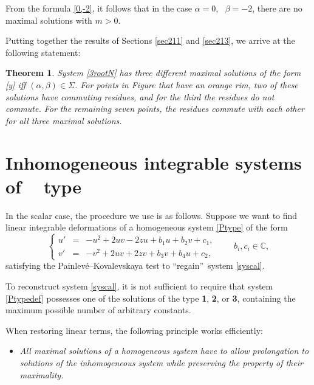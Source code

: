 \documentclass{article}
\theoremstyle{plain}
\newtheorem{theorem}{Theorem}
\DeclareMathOperator{\PIV}{P_{4}}
\newcommand{\PPainleve}{Painlev{\'e}}
\begin{document}
From the formula \eqref{0,-2}, it follows that in the case  $\alpha=0$, \, $\beta=-2$, there are no maximal solutions with $m>0$.

Putting together the results of Sections \ref{sec211} and \ref{sec213}, we arrive at the following statement:

\begin{theorem}\label{theo4}
System \eqref{3rootN} has three different maximal solutions of the form \eqref{y} iff $(\alpha,\beta) \in \Sigma$. For points in Figure \text{\rm{\ref{pic:albetplane}}} that have an orange rim, two of these solutions have commuting residues, and for the third the residues do not commute. For the remaining seven points, the residues commute with each other for all three maximal solutions.
\end{theorem}


\section{Inhomogeneous integrable systems of \texorpdfstring{$\PIV$}{P4} type}
\label{sec:P4tailedsystems}

In the scalar case, the procedure we use is as follows.
Suppose we want to find linear integrable deformations of a homogeneous system \eqref{Ptype} of the form
\begin{equation}\label{Ptypedef}
\left\{
\begin{array}{lcl}
u' &=& -u^2 + 2 u v - 2 z u + b_1 u + b_2 v + c_1, \\[2mm]
v' &=& -v^2 + 2 u v + 2 z v + b_3 v + b_4 u + c_2,
\end{array}
\right. \qquad b_i, c_i \in{\mathbb C}, 
\end{equation}
satisfying the \PPainleve--Kovalevskaya test to ``regain''\, system \eqref{syscal}. 

To reconstruct system \eqref{syscal}, it is not sufficient to require that system \eqref{Ptypedef} possesses one of the solutions of the type {\bf 1}, {\bf 2}, or {\bf 3}, containing the maximum possible number of arbitrary constants.

When restoring linear terms, the following principle works efficiently:
\begin{itemize} \item {\it All maximal solutions of a homogeneous system have to allow prolongation to solutions of the inhomogeneous system while preserving the property of their maximality. }
\end{itemize}
\end{document}

